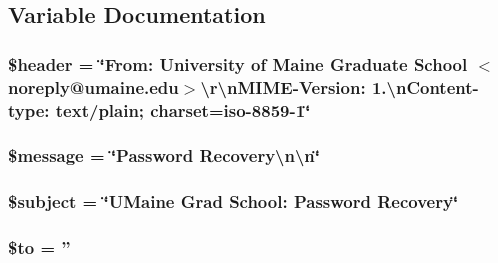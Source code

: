\subsection{Variable Documentation}
\hypertarget{forgot_password_8email_8php_a4f44601f2b9dc8a1644bce53c94ce622}{
\subsubsection[{\$header}]{\setlength{\rightskip}{0pt plus 5cm}\$header = \char`\"{}From\-: University of Maine Graduate School $<$noreply@umaine.\-edu$>$\textbackslash{}r\textbackslash{}n\-M\-I\-M\-E-\/Version\-: 1.\textbackslash{}n\-Content-\/type\-: text/plain; charset=iso-\/8859-\/1\char`\"{}}}\label{forgot_password_8email_8php_a4f44601f2b9dc8a1644bce53c94ce622}
\hypertarget{forgot_password_8email_8php_abf17cb2dba2ed17cb28aa5f37deb5293}{
\subsubsection[{\$message}]{\setlength{\rightskip}{0pt plus 5cm}\$message = \char`\"{}Password Recovery\textbackslash{}n\textbackslash{}n\char`\"{}}}\label{forgot_password_8email_8php_abf17cb2dba2ed17cb28aa5f37deb5293}
\hypertarget{forgot_password_8email_8php_afea90503726cd5ad2eb80baf0b6d217d}{
\subsubsection[{\$subject}]{\setlength{\rightskip}{0pt plus 5cm}\$subject = \char`\"{}U\-Maine Grad School\-: Password Recovery\char`\"{}}}\label{forgot_password_8email_8php_afea90503726cd5ad2eb80baf0b6d217d}
\hypertarget{forgot_password_8email_8php_ac19f839b525d6d99d063fe56bf2a6d3b}{
\subsubsection[{\$to}]{\setlength{\rightskip}{0pt plus 5cm}\$to = ''}}\label{forgot_password_8email_8php_ac19f839b525d6d99d063fe56bf2a6d3b}

